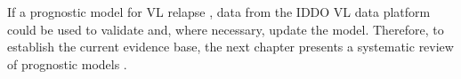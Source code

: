 If a prognostic model for VL relapse , data from the IDDO VL data platform could be used to validate and, where necessary, update the model\cite{collins2024A}. Therefore, to establish the current evidence base, the next chapter presents a systematic review of prognostic models .
